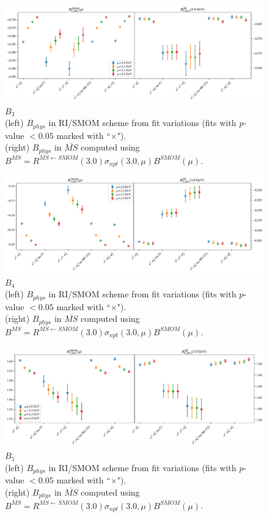 \documentclass[12pt]{extarticle}
\begin{document}
\begin{figure}
\centering
\includegraphics[page=1, width=1.1\textwidth]{SSmPP/SUSY_F/fit_summary.pdf}
\caption{$B_{3}$\\(left) $B_{phys}$ in RI/SMOM scheme from fit variations (fits with $p$-value $<0.05$ marked with ``$\times$"). \\(right) $B_{phys}$ in $\overline{MS}$ computed using $B^{\overline{MS}} = R^{\overline{MS}\leftarrow SMOM}(3.0)\sigma_{npt}(3.0,\mu) B^{SMOM}(\mu)$.}
\end{figure}
\clearpage
\begin{figure}
\centering
\includegraphics[page=1, width=1.1\textwidth]{SSpPP/SUSY_F/fit_summary.pdf}
\caption{$B_{4}$\\(left) $B_{phys}$ in RI/SMOM scheme from fit variations (fits with $p$-value $<0.05$ marked with ``$\times$"). \\(right) $B_{phys}$ in $\overline{MS}$ computed using $B^{\overline{MS}} = R^{\overline{MS}\leftarrow SMOM}(3.0)\sigma_{npt}(3.0,\mu) B^{SMOM}(\mu)$.}
\end{figure}
\clearpage
\begin{figure}
\centering
\includegraphics[page=1, width=1.1\textwidth]{TT/SUSY_F/fit_summary.pdf}
\caption{$B_{5}$\\(left) $B_{phys}$ in RI/SMOM scheme from fit variations (fits with $p$-value $<0.05$ marked with ``$\times$"). \\(right) $B_{phys}$ in $\overline{MS}$ computed using $B^{\overline{MS}} = R^{\overline{MS}\leftarrow SMOM}(3.0)\sigma_{npt}(3.0,\mu) B^{SMOM}(\mu)$.}
\end{figure}
\clearpage
\end{document}

